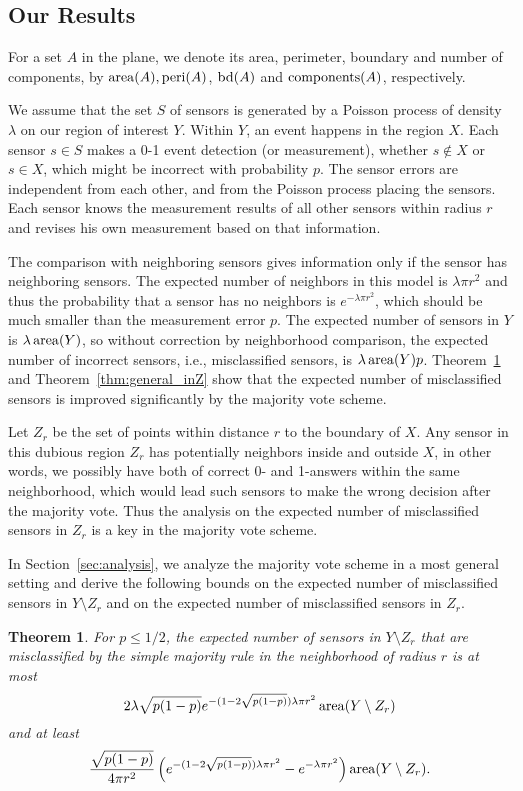 \documentclass{article}
\newtheorem{theorem}{Theorem}
\def\area{\mathop{\rm area}}
\def\bd{\mathop{\rm bd}}
\def\peri{\mathop{\rm peri}}
\def\components{\mathop{\rm components}}
\begin{document}
\subsection{Our Results}

For a set $A$ in the plane, we denote its area, perimeter, boundary and number of components, by $\area(A), \peri(A)$, $\bd(A)$ and $\components(A)$, respectively.

\par
We assume that the set $S$ of sensors is generated by a Poisson process of density $\lambda$ on our region of interest $Y$. Within $Y$, an event happens in the region $X$. Each sensor $s\in S$ makes a 0-1 event detection (or measurement), whether $s \not\in X$ or $s \in X$, which might be incorrect with probability $p$. The sensor errors are independent from each other, and from the Poisson process placing the sensors. Each sensor knows the measurement results of all other sensors within radius $r$ and revises his own measurement based on that information.

\par
The comparison with neighboring sensors gives information only if the sensor has neighboring sensors. The expected number of neighbors in this model is $\lambda\pi r^2$ and thus the probability that a sensor has no neighbors is $e^{-{\lambda\pi r^2}}$, which should be much smaller than the measurement error $p$. The expected number of sensors in $Y$ is $\lambda\area(Y)$, so without correction by neighborhood comparison, the expected number of incorrect sensors, i.e., misclassified sensors, is $\lambda\area(Y)p$. Theorem~\ref{thm:general_outZ} and Theorem~\ref{thm:general_inZ} show that the expected number of misclassified sensors is improved significantly by the majority vote scheme.

\par
Let $Z_r$ be the set of points within distance $r$ to the boundary of $X$. Any sensor in this dubious region $Z_r$ has potentially neighbors inside and outside $X$, in other words, we possibly have both of correct 0- and 1-answers within the same neighborhood, which would lead such sensors to make the wrong decision after the majority vote. Thus the analysis on the expected number of misclassified sensors in $Z_r$ is a key in the majority vote scheme.

In Section~\ref{sec:analysis}, we analyze the majority vote scheme in a most general setting and derive the following bounds on the expected number of misclassified sensors in $Y\setminus Z_r$ and on the expected number of misclassified sensors in $Z_r$.
\begin{theorem}\label{thm:general_outZ}
For $p \leq 1/2$, the expected number of sensors in $Y \setminus Z_r$ that are misclassified by the simple majority rule in the neighborhood of radius $r$ is at most
$$2\lambda \sqrt{p(1-p)}e^{-(1-2\sqrt{p(1-p)})\lambda\pi r^2}\area(Y\setminus Z_r)$$
and at least
$$\frac{\sqrt{p(1-p)}}{4\pi r^2} \left(e^{-(1-2\sqrt{p(1-p)})\lambda\pi r^2}-e^{-\lambda\pi r^2}\right)\area(Y\setminus Z_r).$$
\end{theorem}
\end{document}
